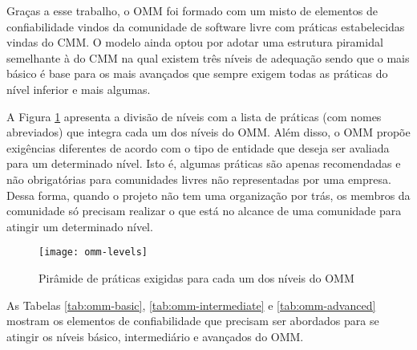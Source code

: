 Graças a esse trabalho, o OMM foi formado com um misto de elementos de
confiabilidade vindos da comunidade de software livre com práticas
estabelecidas vindas do CMM. O modelo ainda optou por adotar uma
estrutura piramidal semelhante à do CMM na qual existem três níveis de
adequação sendo que o mais básico é base para os mais avançados que
sempre exigem todas as práticas do nível inferior e mais algumas.

A Figura \ref{fig:piramide-omm} apresenta a divisão de níveis com a
lista de práticas (com nomes abreviados) que integra cada um dos
níveis do OMM. Além disso, o OMM propõe exigências diferentes de
acordo com o tipo de entidade que deseja ser avaliada para um
determinado nível. Isto é, algumas práticas são apenas recomendadas e
não obrigatórias para comunidades livres não representadas por uma
empresa. Dessa forma, quando o projeto não tem uma organização por
trás, os membros da comunidade só precisam realizar o que está no
alcance de uma comunidade para atingir um determinado nível.

\begin{figure}
  \centering
  \texttt{[image: omm-levels]}
  \caption{Pirâmide de práticas exigidas para cada um dos níveis do
    OMM}
  \label{fig:piramide-omm}
\end{figure}

As Tabelas \ref{tab:omm-basic}, \ref{tab:omm-intermediate} e
\ref{tab:omm-advanced} mostram os elementos de confiabilidade que
precisam ser abordados para se atingir os níveis básico,
intermediário e avançados do OMM.

